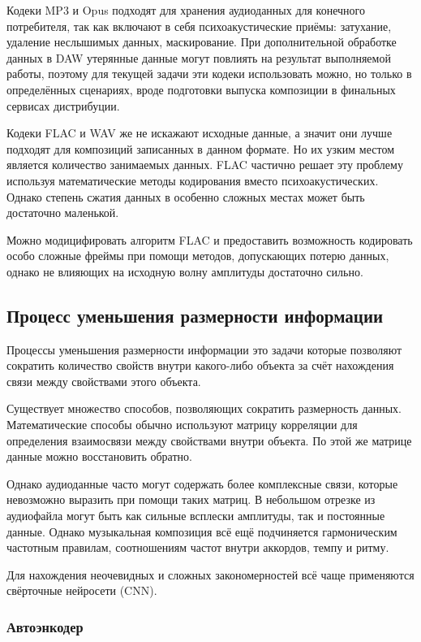 \documentclass[a4paper, 12pt, oneside]{article}
\begin{document}
Кодеки MP3 и Opus подходят для хранения аудиоданных для конечного потребителя, так как включают в себя психоакустические приёмы: 
затухание, удаление неслышимых данных, маскирование. При дополнительной обработке данных в DAW утерянные данные могут 
повлиять на результат выполняемой работы, поэтому для текущей задачи эти кодеки использовать можно, но только в определённых сценариях, 
вроде подготовки выпуска композиции в финальных сервисах дистрибуции. 

Кодеки FLAC и WAV же не искажают исходные данные, а значит они лучше подходят для композиций записанных в данном формате. Но их 
узким местом является количество занимаемых данных. FLAC частично решает эту проблему используя математические методы кодирования
вместо психоакустических. Однако степень сжатия данных в особенно сложных местах может быть достаточно маленькой.

Можно модицифировать алгоритм FLAC и предоставить возможность кодировать особо сложные фреймы при помощи методов, допускающих
потерю данных, однако не влияющих на исходную волну амплитуды достаточно сильно. 

\subsection{Процесс уменьшения размерности информации}

Процессы уменьшения размерности информации это задачи которые позволяют сократить количество свойств внутри
какого-либо объекта за счёт нахождения связи между свойствами этого объекта. 

Существует множество способов, позволяющих сократить размерность данных. Математические способы обычно используют
матрицу корреляции для определения взаимосвязи между свойствами внутри объекта. По этой же матрице данные можно
восстановить обратно. 

Однако аудиоданные часто могут содержать более комплексные связи, которые невозможно выразить при помощи таких матриц. 
В небольшом отрезке из аудиофайла могут быть как сильные всплески амплитуды, так и постоянные данные. Однако 
музыкальная композиция всё ещё подчиняется гармоническим частотным правилам, соотношениям частот внутри аккордов, 
темпу и ритму. 

Для нахождения неочевидных и сложных закономерностей всё чаще применяются свёрточные нейросети (CNN).

\subsubsection{Автоэнкодер}
\end{document}

